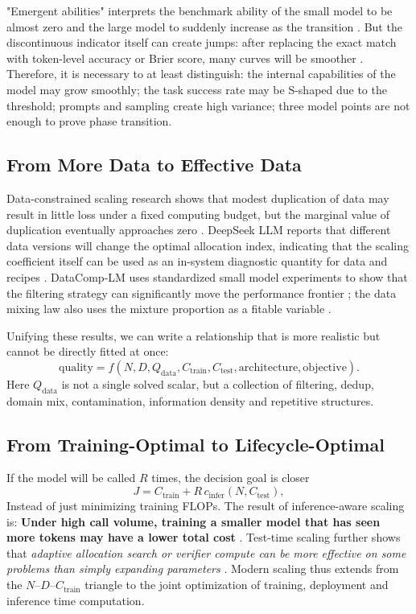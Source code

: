 \documentclass[UTF8,10pt,a4paper,fontset=none]{ctexart}
\begin{document}
"Emergent abilities" interprets the benchmark ability of the small model to be almost zero and the large model to suddenly increase as the transition \cite{wei2022}. But the discontinuous indicator itself can create jumps: after replacing the exact match with token-level accuracy or Brier score, many curves will be smoother \cite{schaeffer2023}. Therefore, it is necessary to at least distinguish: the internal capabilities of the model may grow smoothly; the task success rate may be S-shaped due to the threshold; prompts and sampling create high variance; three model points are not enough to prove phase transition.

\subsection{From More Data to Effective Data}

Data-constrained scaling research shows that modest duplication of data may result in little loss under a fixed computing budget, but the marginal value of duplication eventually approaches zero \cite{muennighoff2023}. DeepSeek LLM reports that different data versions will change the optimal allocation index, indicating that the scaling coefficient itself can be used as an in-system diagnostic quantity for data and recipes \cite{deepseekllm2024}. DataComp-LM uses standardized small model experiments to show that the filtering strategy can significantly move the performance frontier \cite{datacomplm2024}; the data mixing law also uses the mixture proportion as a fitable variable \cite{datamixing2024}.

Unifying these results, we can write a relationship that is more realistic but cannot be directly fitted at once:
\begin{equation}
 \mathrm{quality}=f\!\left(N,D,Q_{\mathrm{data}},C_{\mathrm{train}},
 C_{\mathrm{test}},\mathrm{architecture},\mathrm{objective}\right).
 \label{eq:modern-scaling}
\end{equation}
Here $Q_{\mathrm{data}}$ is not a single solved scalar, but a collection of filtering, dedup, domain mix, contamination, information density and repetitive structures.

\subsection{From Training-Optimal to Lifecycle-Optimal}

If the model will be called $R$ times, the decision goal is closer
\begin{equation}
  J=C_{\mathrm{train}}+R\,c_{\mathrm{infer}}(N,C_{\mathrm{test}}),
  \label{eq:lifecycle}
\end{equation}
Instead of just minimizing training FLOPs. The result of inference-aware scaling is: \textbf{ Under high call volume, training a smaller model that has seen more tokens may have a lower total cost }\cite{sardana2024}. Test-time scaling further shows that \textit{ adaptive allocation search or verifier compute can be more effective on some problems than simply expanding parameters }\cite{snell2024}. Modern scaling thus extends from the $N$--$D$--$C_{\mathrm{train}}$ triangle to the joint optimization of training, deployment and inference time computation.
\end{document}
